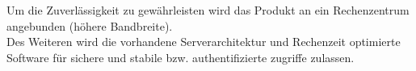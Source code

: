 Um die Zuverlässigkeit zu gewährleisten wird das Produkt an ein Rechenzentrum angebunden (höhere Bandbreite).\\Des Weiteren wird die vorhandene Serverarchitektur und Rechenzeit optimierte Software für sichere und stabile bzw. authentifizierte zugriffe zulassen.